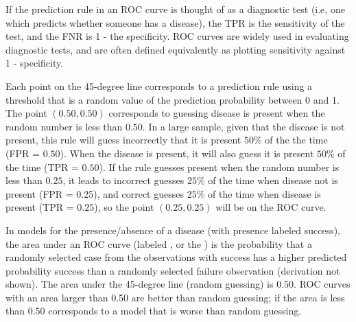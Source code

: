 If the prediction rule in an ROC curve is thought of as a diagnostic test (i.e, one which predicts whether someone has a disease), the TPR is the sensitivity of the test, and the FNR is 1 - the specificity.  ROC curves are widely used in evaluating diagnostic tests, and are often defined equivalently as plotting sensitivity against 1 - specificity.

Each point on the 45-degree line corresponds to a prediction rule using a threshold that is a random value of the prediction probability between 0 and 1. The point $(0.50, 0.50)$ corresponds to guessing disease is present when the random number is less than $0.50$.  In a large sample, given that the disease is not present, this rule will guess incorrectly that it is present $50\%$ of the the time (FPR = $0.50$).  When the disease is present, it will also guess it is present $50\%$ of the time (TPR = $0.50$). If the rule guesses present when the random number is less than $0.25$, it leads to incorrect guesses $25\%$ of the time when disease not is present (FPR = 0.25), and correct guesses $25\%$ of the time when disease is present (TPR = $0.25$), so the point $(0.25, 0.25)$ will be on the ROC curve.  

In models for the presence/absence of a disease (with presence labeled success), the area under an ROC curve (labeled ,   or the ) is the probability that a randomly selected case from the observations with  success has a higher predicted probability success than a randomly selected failure observation (derivation not shown).  The area under the 45-degree line (random guessing) is $0.50$.  ROC curves with an area larger than 0.50 are better than random guessing; if the area is less than $0.50$ corresponds to a model that is worse than random guessing.  

